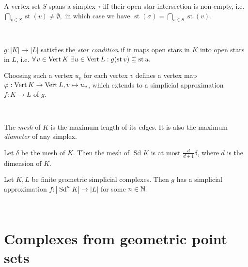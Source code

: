 \begin{multicols*}{3}
\rspace
\begin{remark}A vertex set $S$ spans a simplex $\tau$ iff their open star intersection is non-empty, i.e. $\bigcap_{v\in S} \operatorname{st}(v) \neq \emptyset,$ in which case we have
$
\operatorname{st}(\sigma) = \bigcap_{v\in S}\operatorname{st}(v). $
\end{remark}
\rspace\drawaline\\\vspace{-0.7pc}
\begin{definition}
$g: |K| \to |L|$ satisfies the \emph{star condition} if it maps open stars in $K$ into open stars in $L$, i.e.
$\forall v \in \vertex K \ \exists u \in \vertex L: g(\operatorname{st}v) \subseteq \operatorname{st} u.$
\end{definition}
\rspace
\begin{rem}
Choosing such a vertex $u_v$ for each vertex $v$ defines a vertex map $\varphi: \operatorname{Vert} K \to \operatorname{Vert} L, v \mapsto u_v$, which extends to a simplicial approximation $f:K\to L$ of $g$.
\end{rem}
\rspace\drawaline\\\vspace{-0.7pc}
\begin{definition}[Mesh]
The \emph{mesh} of $K$ is the maximum length of its edges. It is also the maximum \emph{diameter} of any simplex.
\end{definition}
\rspace
\begin{rem}
Let $\delta$ be the mesh of $K$. Then the mesh of $\operatorname{Sd} K$ is at most $\frac{d}{d+1}\delta$, where $d$ is the dimension of $K$.
\end{rem}
\rspace
\begin{theorem}
Let $K,L$ be finite geometric simplicial complexes. Then $g$ has a simplicial approximation $f:|\operatorname{Sd}^n K| \to |L|$ for some $n\in \mathbb{N}$.
\end{theorem}
\rspace\drawaline\\\vspace{-0.5pc}
\section{Complexes from geometric point sets}

\end{multicols*}
